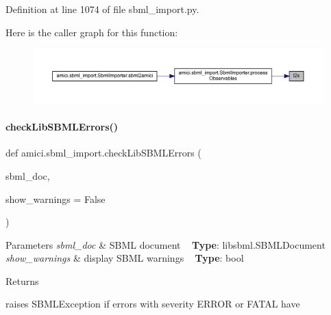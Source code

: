 Definition at line 1074 of file sbml\+\_\+import.\+py.

Here is the caller graph for this function\+:
\nopagebreak
\begin{figure}[H]
\begin{center}
\leavevmode
\includegraphics[width=350pt]{namespaceamici_1_1sbml__import_a6bff3fedaa877c35e5ea7bc112ec4adf_icgraph}
\end{center}
\end{figure}
\mbox{\label{namespaceamici_1_1sbml__import_ade50d6eafb9bcd9f1f6f13d08b0a3910}} 
\paragraph{\texorpdfstring{checkLibSBMLErrors()}{checkLibSBMLErrors()}}
{\footnotesize\ttfamily def amici.\+sbml\+\_\+import.\+check\+Lib\+S\+B\+M\+L\+Errors (\begin{DoxyParamCaption}\item[{}]{sbml\+\_\+doc,  }\item[{}]{show\+\_\+warnings = {\ttfamily False} }\end{DoxyParamCaption})}


\begin{DoxyParams}{Parameters}
{\em sbml\+\_\+doc} & S\+B\+ML document ~\newline
{\bfseries{Type}}\+: libsbml.\+S\+B\+M\+L\+Document \\
\hline
{\em show\+\_\+warnings} & display S\+B\+ML warnings ~\newline
{\bfseries{Type}}\+: bool\\
\hline
\end{DoxyParams}
\begin{DoxyReturn}{Returns}

\end{DoxyReturn}
\begin{DoxyVerb}    raises SBMLException if errors with severity ERROR or FATAL have
\end{DoxyVerb}
 

